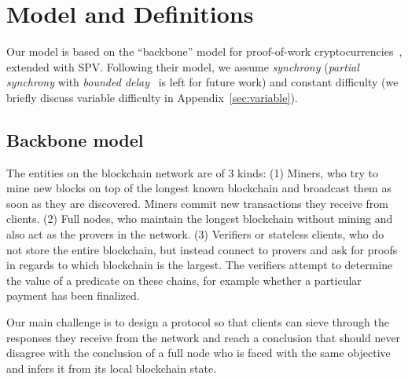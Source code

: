 \section{Model and Definitions}
\label{sec:model}
Our model is based on the ``backbone'' model for proof-of-work
cryptocurrencies~\cite{backbone}, extended with SPV. Following their model, we
assume
\emph{synchrony} (\emph{partial synchrony}
with \emph{bounded delay}~\cite{PSS} is left for future work)
and constant difficulty (we briefly discuss variable difficulty
in Appendix~\ref{sec:variable}).

\subsection{Backbone model}


The entities on the blockchain network are of 3 kinds: (1) Miners, who try to
mine new blocks on top of the longest known blockchain and broadcast them as
soon as they are discovered. Miners commit new transactions they receive from clients. (2) Full nodes, who maintain the longest blockchain
without mining and also act as the provers in the network. (3) Verifiers or
stateless clients, who do not store the entire blockchain, but instead connect to provers and ask for proofs in regards to which
blockchain is the largest. The verifiers attempt to determine the value of a
predicate on these chains, for example whether a particular payment has been finalized.

Our main challenge is to design
a protocol so that clients can sieve through  the responses they receive from
the network and reach a conclusion that should never disagree with the
conclusion of a full  node who is faced with the same objective and infers it
from its local blockchain state.

